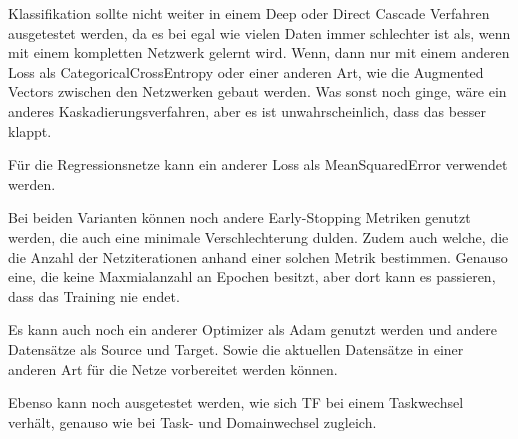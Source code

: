
Klassifikation sollte nicht weiter in einem Deep oder Direct Cascade Verfahren ausgetestet werden, da es bei egal wie vielen Daten 
immer schlechter ist als, wenn mit einem kompletten Netzwerk gelernt wird. Wenn, dann nur mit einem anderen Loss als 
CategoricalCrossEntropy oder einer anderen Art, wie die Augmented Vectors zwischen den Netzwerken gebaut werden. 
Was sonst noch ginge, wäre ein anderes Kaskadierungsverfahren, aber es ist unwahrscheinlich, dass das besser klappt. 

Für die Regressionsnetze kann ein anderer Loss als MeanSquaredError verwendet werden. 

Bei beiden Varianten können noch andere Early-Stopping Metriken genutzt werden, die auch eine minimale Verschlechterung dulden. Zudem auch 
welche, die die Anzahl der Netziterationen anhand 
einer solchen Metrik bestimmen. Genauso eine, die keine Maxmialanzahl an Epochen besitzt, aber dort kann es passieren, dass das Training nie endet. 

Es kann auch noch ein anderer Optimizer als Adam genutzt werden und andere Datensätze als Source und Target. Sowie die aktuellen Datensätze 
in einer anderen 
Art für die Netze vorbereitet werden können. 

Ebenso kann noch ausgetestet werden, wie sich TF bei einem Taskwechsel verhält, genauso wie bei Task- und Domainwechsel zugleich. 
